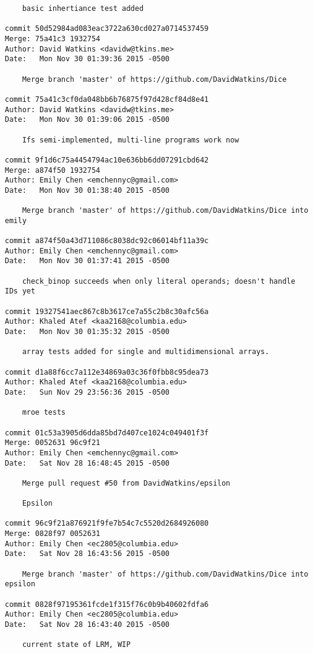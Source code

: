 \begin{verbatim}
    basic inhertiance test added

commit 50d52984ad083eac3722a630cd027a0714537459
Merge: 75a41c3 1932754
Author: David Watkins <davidw@tkins.me>
Date:   Mon Nov 30 01:39:36 2015 -0500

    Merge branch 'master' of https://github.com/DavidWatkins/Dice

commit 75a41c3cf0da048bb6b76875f97d428cf84d8e41
Author: David Watkins <davidw@tkins.me>
Date:   Mon Nov 30 01:39:06 2015 -0500

    Ifs semi-implemented, multi-line programs work now

commit 9f1d6c75a4454794ac10e636bb6dd07291cbd642
Merge: a874f50 1932754
Author: Emily Chen <emchennyc@gmail.com>
Date:   Mon Nov 30 01:38:40 2015 -0500

    Merge branch 'master' of https://github.com/DavidWatkins/Dice into emily

commit a874f50a43d711086c8038dc92c06014bf11a39c
Author: Emily Chen <emchennyc@gmail.com>
Date:   Mon Nov 30 01:37:41 2015 -0500

    check_binop succeeds when only literal operands; doesn't handle IDs yet

commit 19327541aec867c8b3617ce7a55c2b8c30afc56a
Author: Khaled Atef <kaa2168@columbia.edu>
Date:   Mon Nov 30 01:35:32 2015 -0500

    array tests added for single and multidimensional arrays.

commit d1a88f6cc7a112e34869a03c36f0fbb8c95dea73
Author: Khaled Atef <kaa2168@columbia.edu>
Date:   Sun Nov 29 23:56:36 2015 -0500

    mroe tests

commit 01c53a3905d6dda85bd7d407ce1024c049401f3f
Merge: 0052631 96c9f21
Author: Emily Chen <emchennyc@gmail.com>
Date:   Sat Nov 28 16:48:45 2015 -0500

    Merge pull request #50 from DavidWatkins/epsilon
    
    Epsilon

commit 96c9f21a876921f9fe7b54c7c5520d2684926080
Merge: 0828f97 0052631
Author: Emily Chen <ec2805@columbia.edu>
Date:   Sat Nov 28 16:43:56 2015 -0500

    Merge branch 'master' of https://github.com/DavidWatkins/Dice into epsilon

commit 0828f97195361fcde1f315f76c0b9b40602fdfa6
Author: Emily Chen <ec2805@columbia.edu>
Date:   Sat Nov 28 16:43:40 2015 -0500

    current state of LRM, WIP


\end{verbatim}
